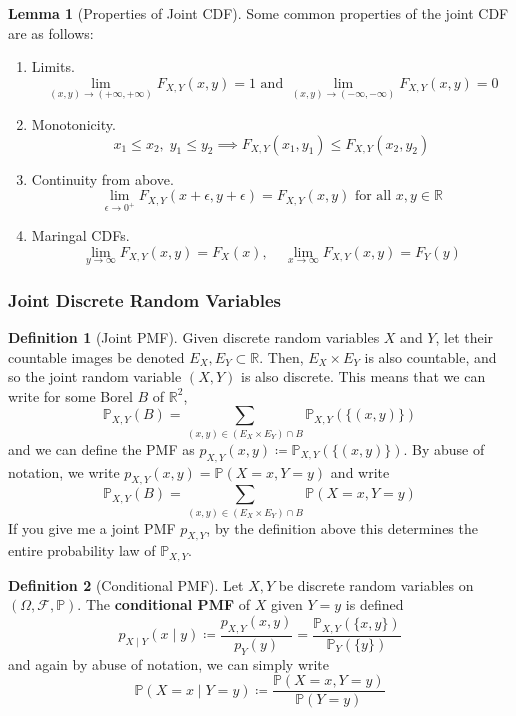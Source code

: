 \documentclass{article}
\theoremstyle{definition}
\newtheorem{lemma}[theorem]{Lemma}
\theoremstyle{remark}
\theoremstyle{definition}
\newtheorem{definition}{Definition}[section]
\begin{document}
\begin{lemma}[Properties of Joint CDF]
Some common properties of the joint CDF are as follows: 
\begin{enumerate}
    \item Limits. 
    \[\lim_{(x, y) \rightarrow (+\infty, +\infty)} F_{X, Y} (x, y) = 1 \text{ and } \lim_{(x, y) \rightarrow (-\infty, -\infty)} F_{X, Y} (x, y) = 0\]
    \item Monotonicity. 
    \[x_1 \leq x_2, \; y_1 \leq y_2 \implies F_{X, Y} (x_1, y_1) \leq F_{X, Y}(x_2, y_2)\]
    \item Continuity from above. 
    \[\lim_{\epsilon \rightarrow 0^+} F_{X, Y} (x + \epsilon, y + \epsilon) = F_{X, Y} (x, y) \text{ for all } x, y \in \mathbb{R}\]
    \item Maringal CDFs. 
    \[\lim_{y \rightarrow \infty} F_{X, Y} (x, y) = F_X (x), \;\;\;\; \lim_{x \rightarrow \infty} F_{X, Y} (x, y) = F_Y (y)\]
\end{enumerate}
\end{lemma}

\subsubsection{Joint Discrete Random Variables}

\begin{definition}[Joint PMF]
Given discrete random variables $X$ and $Y$, let their countable images be denoted $E_X, E_Y \subset \mathbb{R}$. Then, $E_X \times E_Y$ is also countable, and so the joint random variable $(X, Y)$ is also discrete. This means that we can write for some Borel $B$ of $\mathbb{R}^2$, 
\[\mathbb{P}_{X, Y} (B) = \sum_{(x, y) \in (E_X \times E_Y) \cap B} \mathbb{P}_{X, Y} (\{(x, y)\})\]
and we can define the PMF as $p_{X, Y} (x, y) \coloneqq \mathbb{P}_{X, Y} (\{(x, y)\})$. By abuse of notation, we write $p_{X, Y} (x, y) = \mathbb{P} (X = x, Y = y)$ and write 
\[\mathbb{P}_{X, Y} (B) = \sum_{(x, y) \in (E_X \times E_Y) \cap B} \mathbb{P} (X = x, Y = y)\]
If you give me a joint PMF $p_{X, Y}$, by the definition above this determines the entire probability law of $\mathbb{P}_{X, Y}$. 
\end{definition} 

\begin{definition}[Conditional PMF]
Let $X, Y$ be discrete random variables on $(\Omega, \mathcal{F}, \mathbb{P})$. The \textbf{conditional PMF} of $X$ given $Y = y$ is defined 
\[p_{X \mid Y} (x \mid y) \coloneqq \frac{p_{X, Y} (x, y)}{p_Y (y)} = \frac{\mathbb{P}_{X, Y} (\{x, y\})}{\mathbb{P}_Y (\{y\})}\]
and again by abuse of notation, we can simply write 
\[\mathbb{P}(X = x \mid Y = y) \coloneqq \frac{\mathbb{P}(X = x, Y = y)}{\mathbb{P}(Y = y)}\]
\end{definition}
\end{document}
